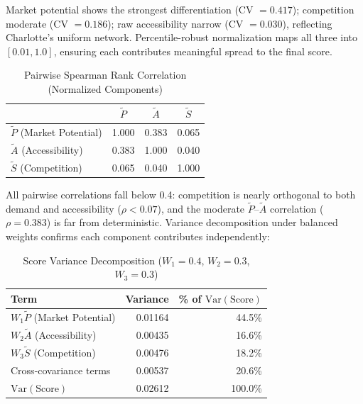\documentclass[conference]{IEEEtran}
\begin{document}
Market potential shows the strongest differentiation (CV $= 0.417$); competition moderate (CV $= 0.186$); raw accessibility narrow (CV $= 0.030$), reflecting Charlotte's uniform network.  Percentile-robust normalization maps all three into $[0.01, 1.0]$, ensuring each contributes meaningful spread to the final score.

\begin{table}[!t]
\centering
\caption{Pairwise Spearman Rank Correlation (Normalized Components)}
\label{tab:correlation}
\begin{tabular}{lccc}
\toprule
& $\widetilde{P}$ & $\widetilde{A}$ & $\widetilde{S}$ \\
\midrule
$\widetilde{P}$ (Market Potential) & 1.000 & 0.383 & 0.065 \\
$\widetilde{A}$ (Accessibility)    & 0.383 & 1.000 & 0.040 \\
$\widetilde{S}$ (Competition)      & 0.065 & 0.040 & 1.000 \\
\bottomrule
\end{tabular}
\end{table}

All pairwise correlations fall below 0.4: competition is nearly orthogonal to both demand and accessibility ($\rho < 0.07$), and the moderate $\widetilde{P}$--$\widetilde{A}$ correlation ($\rho = 0.383$) is far from deterministic.  Variance decomposition under balanced weights confirms each component contributes independently:

\begin{table}[!t]
\centering
\caption{Score Variance Decomposition
         ($W_1 = 0.4$, $W_2 = 0.3$, $W_3 = 0.3$)}
\label{tab:variance}
\begin{tabular}{lrr}
\toprule
\textbf{Term} & \textbf{Variance}
              & \textbf{\% of $\text{Var}(\text{Score})$} \\
\midrule
$W_1 \widetilde{P}$ (Market Potential) & 0.01164 & 44.5\% \\
$W_2 \widetilde{A}$ (Accessibility)    & 0.00435 & 16.6\% \\
$W_3 \widetilde{S}$ (Competition)      & 0.00476 & 18.2\% \\
Cross-covariance terms                 & 0.00537 & 20.6\% \\
\midrule
$\text{Var}(\text{Score})$             & 0.02612 & 100.0\% \\
\bottomrule
\end{tabular}
\end{table}
\end{document}
